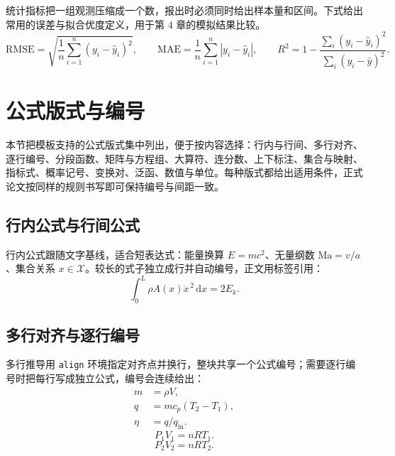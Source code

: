 统计指标把一组观测压缩成一个数，报出时必须同时给出样本量和区间。下式给出常用的误差与拟合优度定义，用于第 4 章的模拟结果比较。
\begin{equation}
  \mathrm{RMSE}=\sqrt{\frac{1}{n}\sum_{i=1}^{n}(y_i-\hat{y}_i)^2},\qquad
  \mathrm{MAE}=\frac{1}{n}\sum_{i=1}^{n}|y_i-\hat{y}_i|,\qquad
  R^2=1-\frac{\sum_i(y_i-\hat{y}_i)^2}{\sum_i(y_i-\bar{y})^2}.
  \label{eq:error-metrics}
\end{equation}

\section{公式版式与编号}

本节把模板支持的公式版式集中列出，便于按内容选择：行内与行间、多行对齐、逐行编号、分段函数、矩阵与方程组、大算符、连分数、上下标注、集合与映射、指标式、概率记号、变换对、泛函、数值与单位。每种版式都给出适用条件，正式论文按同样的规则书写即可保持编号与间距一致。

\subsection{行内公式与行间公式}

行内公式跟随文字基线，适合短表达式：能量换算 $E=mc^2$、无量纲数 $\mathrm{Ma}=v/a$、集合关系 $x\in\mathcal{X}$。较长的式子独立成行并自动编号，正文用标签引用：
\begin{equation}
  \int_0^L \rho A(x)\dot{x}^{\,2}\,\mathrm{d}x=2E_k.
  \label{eq:kinetic-energy-integral}
\end{equation}

\subsection{多行对齐与逐行编号}

多行推导用 \texttt{align} 环境指定对齐点并换行，整块共享一个公式编号；需要逐行编号时把每行写成独立公式，编号会连续给出：
\begin{equation}
  \begin{aligned}
    m &= \rho V,\\
    q &= mc_p(T_2-T_1),\\
    \eta &= q/q_{\mathrm{in}}.
  \end{aligned}
  \label{eq:aligned-derivation}
\end{equation}
\begin{equation}P_1V_1=nRT_1.\label{eq:state-1}\end{equation}
\begin{equation}P_2V_2=nRT_2.\label{eq:state-2}\end{equation}

